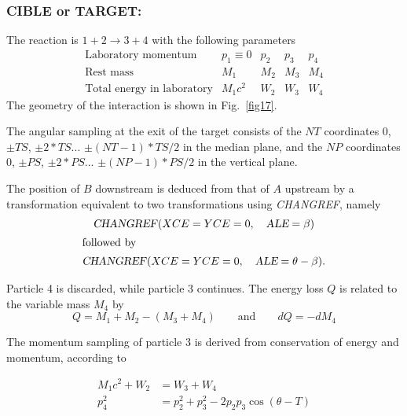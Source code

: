 \vfill




\newpage

\subsubsection*{CIBLE or TARGET: \CIBLETitl}
\label{CIBLE}\label{TARGET}
 
\medskip

 The reaction is $ 1+2 \longrightarrow  3+4 $ with the following parameters 
$$
\begin{array}{lllll}
	\text{Laboratory momentum} & p_1\equiv  0 &  p_2 &   p_3 &    p_4 \\
	\text{Rest mass}           &   M_1        &   M_2 & M_3 &    M_4 \\ 
	\text{Total energy in laboratory} & M_1c^2 &  W_2 &    W_3 &   W_4 
\end{array}
$$
%
 The geometry of the interaction is shown in Fig.~\ref{fig17}.   
\medskip

\noindent The angular  sampling at the exit of the target consists of the $ NT$ 
coordinates 0,  $ \pm TS$,  $ \pm 2\ast TS$...   $\pm (NT-1)\ast TS/2 $ 
in the median plane, 
and the $ NP $ coordinates 0, $ \pm PS$,  $ \pm 2\ast PS$... $ \pm (NP-1)\ast PS/2$ 
in the vertical plane.  
\medskip

\noindent The position of $ B $ downstream is deduced from that of $ A $
upstream  by a transformation equivalent to two transformations using \textsl{CHANGREF},
 namely
 \begin{gather*}
	 \text{\textsl{CHANGREF}}(XCE=YCE=0,\quad  \textsl{ALE}=\beta )  \\
\intertext{followed by} 
	 \text{\textsl{CHANGREF}}(XCE=YCE=0,\quad \textsl{ALE}=\theta -\beta ). 
 \end{gather*}

 
\noindent Particle  4 is discarded, while particle 3 continues. The energy
loss $ Q $ is related to the variable mass $ M_4 $ by
$$ Q=M_1+M_2-(M_3+M_4)\qquad \text{and} \qquad dQ=-dM_4 $$

\noindent The momentum sampling of particle 3 is derived from conservation of
energy and 
momentum, according to 

\begin{align*}
	M_1c^2+W_2 & =  W_3+W_4  \\
	p^2_4 & =  p^2_2 +p^2_3 -2p_2p_3 \cos (\theta -T) 
\end{align*}


